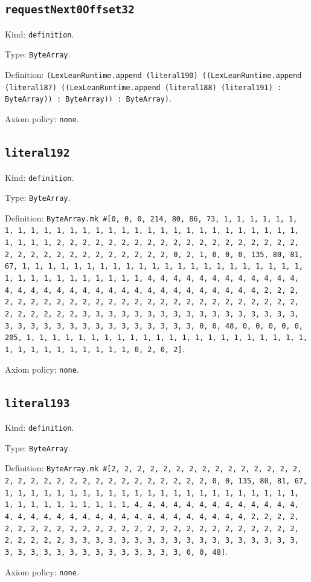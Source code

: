 \documentclass[11pt]{article}
\begin{document}
\subsection*{\texttt{requestNext0Offset32}}
\noindent Kind: \texttt{definition}.\par
\noindent Type: \texttt{ByteArray}.\par
\noindent Definition: \texttt{(LexLeanRuntime.append (literal190) ((LexLeanRuntime.append (literal187) ((LexLeanRuntime.append (literal188) (literal191) : ByteArray)) : ByteArray)) : ByteArray)}.\par
\noindent Axiom policy: \texttt{none}.\par
\subsection*{\texttt{literal192}}
\noindent Kind: \texttt{definition}.\par
\noindent Type: \texttt{ByteArray}.\par
\noindent Definition: \texttt{ByteArray.mk \#[0, 0, 0, 214, 80, 86, 73, 1, 1, 1, 1, 1, 1, 1, 1, 1, 1, 1, 1, 1, 1, 1, 1, 1, 1, 1, 1, 1, 1, 1, 1, 1, 1, 1, 1, 1, 1, 1, 1, 1, 2, 2, 2, 2, 2, 2, 2, 2, 2, 2, 2, 2, 2, 2, 2, 2, 2, 2, 2, 2, 2, 2, 2, 2, 2, 2, 2, 2, 2, 2, 2, 2, 0, 2, 1, 0, 0, 0, 135, 80, 81, 67, 1, 1, 1, 1, 1, 1, 1, 1, 1, 1, 1, 1, 1, 1, 1, 1, 1, 1, 1, 1, 1, 1, 1, 1, 1, 1, 1, 1, 1, 1, 1, 1, 1, 4, 4, 4, 4, 4, 4, 4, 4, 4, 4, 4, 4, 4, 4, 4, 4, 4, 4, 4, 4, 4, 4, 4, 4, 4, 4, 4, 4, 4, 4, 4, 4, 2, 2, 2, 2, 2, 2, 2, 2, 2, 2, 2, 2, 2, 2, 2, 2, 2, 2, 2, 2, 2, 2, 2, 2, 2, 2, 2, 2, 2, 2, 2, 2, 3, 3, 3, 3, 3, 3, 3, 3, 3, 3, 3, 3, 3, 3, 3, 3, 3, 3, 3, 3, 3, 3, 3, 3, 3, 3, 3, 3, 3, 3, 3, 3, 0, 0, 48, 0, 0, 0, 0, 0, 205, 1, 1, 1, 1, 1, 1, 1, 1, 1, 1, 1, 1, 1, 1, 1, 1, 1, 1, 1, 1, 1, 1, 1, 1, 1, 1, 1, 1, 1, 1, 1, 1, 0, 2, 0, 2]}.\par
\noindent Axiom policy: \texttt{none}.\par
\subsection*{\texttt{literal193}}
\noindent Kind: \texttt{definition}.\par
\noindent Type: \texttt{ByteArray}.\par
\noindent Definition: \texttt{ByteArray.mk \#[2, 2, 2, 2, 2, 2, 2, 2, 2, 2, 2, 2, 2, 2, 2, 2, 2, 2, 2, 2, 2, 2, 2, 2, 2, 2, 2, 2, 2, 2, 2, 0, 0, 135, 80, 81, 67, 1, 1, 1, 1, 1, 1, 1, 1, 1, 1, 1, 1, 1, 1, 1, 1, 1, 1, 1, 1, 1, 1, 1, 1, 1, 1, 1, 1, 1, 1, 1, 1, 1, 4, 4, 4, 4, 4, 4, 4, 4, 4, 4, 4, 4, 4, 4, 4, 4, 4, 4, 4, 4, 4, 4, 4, 4, 4, 4, 4, 4, 4, 4, 4, 4, 2, 2, 2, 2, 2, 2, 2, 2, 2, 2, 2, 2, 2, 2, 2, 2, 2, 2, 2, 2, 2, 2, 2, 2, 2, 2, 2, 2, 2, 2, 2, 2, 3, 3, 3, 3, 3, 3, 3, 3, 3, 3, 3, 3, 3, 3, 3, 3, 3, 3, 3, 3, 3, 3, 3, 3, 3, 3, 3, 3, 3, 3, 3, 3, 0, 0, 48]}.\par
\noindent Axiom policy: \texttt{none}.\par
\end{document}
